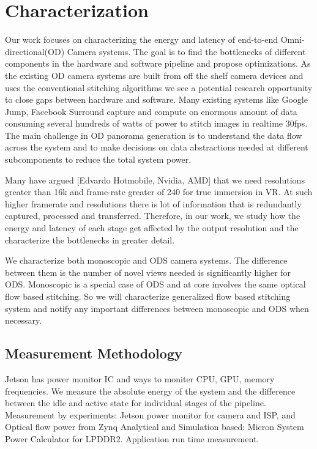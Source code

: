 \chapter{Characterization}

Our work focuses on characterizing the energy and latency of end-to-end Omni-directional(OD) Camera  systems. The goal is to find the bottlenecks of different components in the hardware and software pipeline and propose optimizations. As the existing OD camera systems are built from off the shelf camera devices and uses the conventional stitching algorithms we see a potential research opportunity to close gaps between hardware and software. Many existing systems like Google Jump, Facebook Surround capture and compute on enormous amount of data consuming several hundreds of watts of power to stitch images in realtime 30fps. The main challenge in OD panorama generation is to understand the data flow across the system and to make decisions on data abstractions needed at different subcomponents to reduce the total system power.

Many have argued [Edvardo Hotmobile, Nvidia, AMD] that we need resolutions greater than 16k and frame-rate greater of 240 for true immersion in VR. At such higher framerate and resolutions there is lot of information that is redundantly captured, processed and transferred. Therefore, in our work, we study how the energy and latency of each stage get affected by the output resolution and the characterize the bottlenecks in greater detail. 

We characterize both monoscopic and ODS camera systems. The difference between them is the number of novel views needed is significantly higher for ODS. Monoscopic is a special case of ODS and at core involves the same optical flow based stitching. So we will characterize generalized flow based stitching system and notify any important differences between monoscopic and ODS when necessary.\newline


\section{Measurement Methodology} %
Jetson has power monitor IC and ways to moniter CPU, GPU, memory frequencies. We measure the absolute energy of the system and the difference between the idle and active state for individual stages of the pipeline.
Measurement by experiments:
Jetson power monitor for camera and ISP, and Optical flow power from Zynq\newline
Analytical and Simulation based:
Micron System Power Calculator for LPDDR2. \newline
Application run time measurement.




